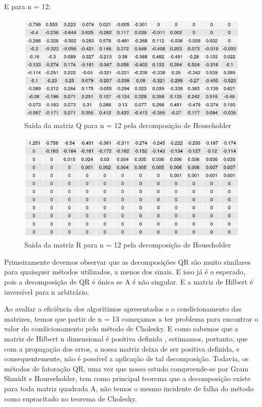 \documentclass[12pt, a4paper]{article}
\begin{document}
E para n = 12:
\begin{figure}[!htbp]
    \centering
    \includegraphics[width= 14.5cm]{matrizes/matriz_hilbert_HS_Q12.png}
    \caption{Saída da matriz Q para n = 12 pela decomposição de Householder}
    \label{fig:my_label}
\end{figure}
 \pagebreak
\begin{figure}[!htbp]
    \centering
    \includegraphics[width = 14.5cm]{matrizes/matriz_hilbert_HS_R12.png}
    \caption{Saída da matriz R para n = 12 pela decomposição de Householder}
    \label{fig:my_label}
\end{figure}


Primeiramente devemos observar que as decomposições QR são muito similares para quaisquer métodos utilizados, a menos dos sinais. E isso já é o esperado, pois a decomposição de QR é única se A é não singular. E a matriz de Hilbert é inversível para n arbitrário.

Ao avaliar a eficiência dos algoritimos apresentados e o condicionamento das matrizes, temos que  partir de n = 13 começamos a ter problema para encontrar o valor do condicionamento pelo método de Cholesky. E como sabemos que a matriz de Hilbert n dimensional é positiva definida \cite{song2014infinite}, estimamos, portanto, que com a propagação dos erros, a nossa matriz deixa de ser positiva definida, e consequentemente, não é possível a aplicação de tal decomposição. Todavia, os métodos de fatoração QR, uma vez que nosso estudo compreende-se por Gram Shmidt e Hourseholder, tem como principal teorema que a decomposição existe para toda matriz quadrada A, não temos o mesmo incidente de falha do método como supracitado no teorema de Cholesky.
\end{document}
